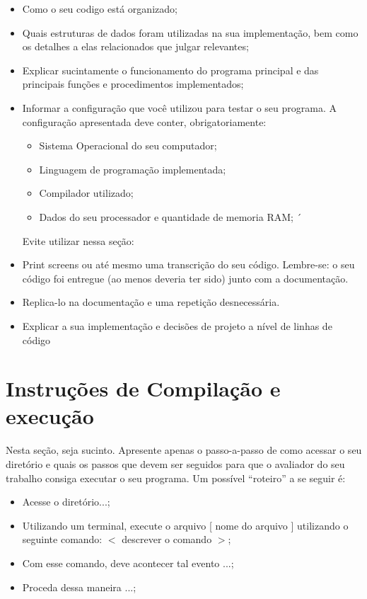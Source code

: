 \documentclass[11pt]{article}
\begin{document}
    \begin{itemize}
        \item Como o seu codigo está organizado;
        \item Quais estruturas de dados foram utilizadas na sua implementação, bem como os detalhes a elas relacionados que julgar relevantes;
        \item Explicar sucintamente o funcionamento do programa principal e das principais funções e procedimentos implementados;
        \item Informar a configuração que você utilizou para testar o seu programa. A configuração apresentada deve conter, obrigatoriamente:
        \begin{itemize}
            \item Sistema Operacional do seu computador;
            \item Linguagem de programação implementada;
            \item Compilador utilizado;
            \item Dados do seu processador e quantidade de memoria RAM; ´
        \end{itemize}
        Evite utilizar nessa seção:
        \item Print screens ou até mesmo uma transcrição do seu código. Lembre-se: o seu código foi entregue (ao menos deveria ter sido) junto com a documentação.
        \item Replica-lo na documentação e uma repetição desnecessária.
        \item Explicar a sua implementação e decisões de projeto a nível de linhas de código
    \end{itemize}


\section{Instruções de Compilação e execução}

    \par Nesta seção, seja sucinto. Apresente apenas o passo-a-passo de como acessar o seu diretório e quais os passos que devem ser seguidos para que o avaliador do seu trabalho consiga executar o seu programa. Um possível “roteiro” a se seguir é:

    \begin{itemize}
        \item Acesse o diretório...;
        \item Utilizando um terminal, execute o arquivo [ nome do arquivo ] utilizando o seguinte comando: $<$ descrever o comando $>$;
        \item Com esse comando, deve acontecer tal evento ...;
        \item Proceda dessa maneira ...;
    \end{itemize}
\end{document}
